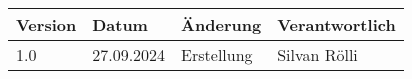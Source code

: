 \begin{tabularx}{\textwidth}{l l X l}
        \textbf{Version} & \textbf{Datum} & \textbf{Änderung} & \textbf{Verantwortlich} \\ \hline
        1.0 & 27.09.2024 & Erstellung & Silvan Rölli \\ \hline
\end{tabularx}

